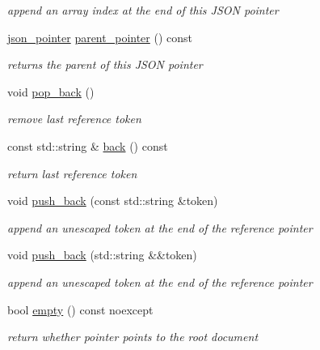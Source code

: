 \begin{DoxyCompactItemize}
\begin{DoxyCompactList}\small\item\em append an array index at the end of this J\+S\+ON pointer \end{DoxyCompactList}\item 
\mbox{\hyperlink{classnlohmann_1_1json__pointer}{json\+\_\+pointer}} \mbox{\hyperlink{classnlohmann_1_1json__pointer_afdaacce1edb7145e0434e014f0e8685a}{parent\+\_\+pointer}} () const
\begin{DoxyCompactList}\small\item\em returns the parent of this J\+S\+ON pointer \end{DoxyCompactList}\item 
void \mbox{\hyperlink{classnlohmann_1_1json__pointer_a4b1ee4d511ca195bed896a3da47e264c}{pop\+\_\+back}} ()
\begin{DoxyCompactList}\small\item\em remove last reference token \end{DoxyCompactList}\item 
const std\+::string \& \mbox{\hyperlink{classnlohmann_1_1json__pointer_a213bc67c32a30c68ac6bf06f5195d482}{back}} () const
\begin{DoxyCompactList}\small\item\em return last reference token \end{DoxyCompactList}\item 
void \mbox{\hyperlink{classnlohmann_1_1json__pointer_a697d12b5bd6205f8866691b166b7c7dc}{push\+\_\+back}} (const std\+::string \&token)
\begin{DoxyCompactList}\small\item\em append an unescaped token at the end of the reference pointer \end{DoxyCompactList}\item 
void \mbox{\hyperlink{classnlohmann_1_1json__pointer_ac228b13596d3c34185da9fe61b570194}{push\+\_\+back}} (std\+::string \&\&token)
\begin{DoxyCompactList}\small\item\em append an unescaped token at the end of the reference pointer \end{DoxyCompactList}\item 
bool \mbox{\hyperlink{classnlohmann_1_1json__pointer_a649252bda4a2e75a0915b11a25d8bcc3}{empty}} () const noexcept
\begin{DoxyCompactList}\small\item\em return whether pointer points to the root document \end{DoxyCompactList}\end{DoxyCompactItemize}
